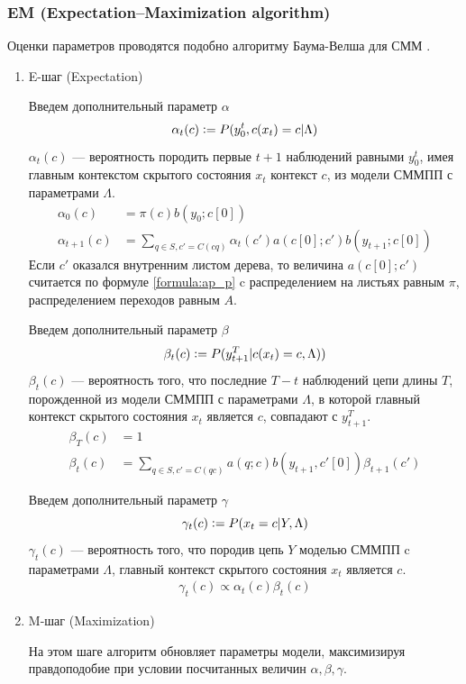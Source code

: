 \documentclass{matmex-diploma-custom}
\begin{document}
\subsubsection{EM (Expectation–Maximization algorithm)}
Оценки параметров проводятся подобно алгоритму Баума-Велша для СММ \cite{Rabiner1989}.
\begin{enumerate}
\item E-шаг (Expectation)

Введем дополнительный параметр $\alpha$
$$ \alpha_{t}(c) \mathrel{\mathop:}= P(y_{0}^{t}, c(x_{t})=c| \Lambda)$$
$\alpha_{t}(c)$ --- вероятность породить первые $t+1$ наблюдений равными $y_{0}^{t}$, имея главным контекстом  скрытого состояния $x_{t}$ контекст $ c $, из модели СММПП с параметрами $\Lambda$.
\begin{align}
\alpha_{0}(c) &= \pi(c)b(y_{0}; c[0]) \nonumber \\
\alpha_{t+1}(c) &= \sum_{q \in S, c'=C(cq)}{\alpha_{t}(c')a(c[0];c')b(y_{t+1}; c[0])}
\label{formula:alpha}
\end{align}
Если $c'$ оказался внутренним листом дерева, то величина $a(c[0];c')$ считается по формуле \ref{formula:ap_p} c распределением на листьях равным $\pi$, распределением переходов равным $A$.

Введем дополнительный параметр $\beta$
$$ \beta_{t}(c) \mathrel{\mathop:}= P(y_{t+1}^{T}| c(x_{t})=c, \Lambda))$$
$\beta_{t}(c)$ --- вероятность того, что последние $T-t$ наблюдений цепи длины $T$, порожденной из модели СММПП с параметрами $\Lambda$, в которой главный контекст скрытого состояния $x_{t}$ является $ c $, совпадают с $y_{t+1}^{T}$.
\begin{align}
\beta_{T}(c) &= 1 \nonumber \\
\beta_{t}(c) &= \sum_{q \in S, c'=C(qc)}{a(q;c)b(y_{t+1}, c'[0])\beta_{t+1}(c')}
\label{formula:beta}
\end{align}

Введем дополнительный параметр $\gamma$
$$ \gamma_{t}(c) \mathrel{\mathop:}= P(x_{t}=c|Y,\Lambda) $$ 
$\gamma_{t}(c)$ --- вероятность того, что породив цепь $Y$ моделью СММПП c параметрами $\Lambda$,
главный контекст скрытого состояния $ x_{t} $ является $c$.
\begin{align}
\gamma_{t}(c) \propto {\alpha_{t}(c)\beta_{t}(c)}
\label{formula:gamma}
\end{align}

\item M-шаг (Maximization)

На этом шаге алгоритм обновляет параметры модели, максимизируя правдоподобие при условии посчитанных величин $\alpha, \beta, \gamma$.


\end{enumerate}
\end{document}

